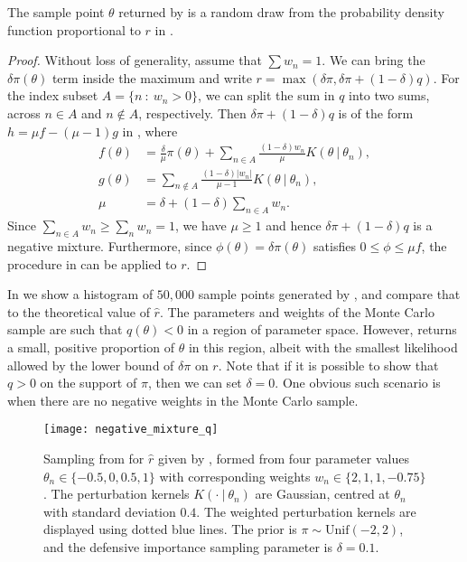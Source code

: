 \documentclass[review]{siamonline190516}
\begin{document}
\begin{proposition}
The sample point $\theta$ returned by  is a random draw from the probability density function proportional to $r$ in .
\end{proposition}
\begin{proof}
Without loss of generality, assume that $\sum w_n = 1$.
We can bring the $\delta \pi(\theta)$ term inside the maximum and write $r = \max(\delta \pi, \delta \pi + (1-\delta) q)$.
For the index subset $A = \{ n~:~w_n>0 \}$, we can split the sum in $q$ into two sums, across $n \in A$ and $n \notin A$, respectively.
Then $\delta \pi + (1-\delta) q$ is of the form $h = \mu f - (\mu - 1) g$ in , where
\begin{align*}
f(\theta) &= \frac{\delta}{\mu} \pi(\theta) + \sum_{n \in A} \frac{(1-\delta) w_n}{\mu} K(\theta~|~\theta_n),
\\
g(\theta) &= \sum_{n \notin A} \frac{(1-\delta)\left|w_n\right|}{\mu - 1} K(\theta~|~\theta_n),
\\
\mu &= \delta + (1-\delta) \sum_{n \in A} w_n.
\end{align*}
Since $\sum_{n \in A} w_n \geq \sum_n w_n = 1$, we have $\mu \geq 1$ and hence $\delta \pi + (1-\delta) q$ is a negative mixture.
Furthermore, since $\phi(\theta) = \delta \pi(\theta)$ satisfies $0 \leq \phi\leq \mu f$, the procedure in  can be applied to $r$.
\end{proof}

In  we show a histogram of $50,000$ sample points generated by , and compare that to the theoretical value of $\hat r$.
The parameters and weights of the Monte Carlo sample are such that $q(\theta) < 0$ in a region of parameter space. 
However,  returns a small, positive proportion of $\theta$ in this region, albeit with the smallest likelihood allowed by the lower bound of $\delta \pi$ on $r$.
Note that if it is possible to show that $q>0$ on the support of $\pi$, then we can set $\delta=0$.
One obvious such scenario is when there are no negative weights in the Monte Carlo sample.

\begin{figure}
\centering
\texttt{[image: negative\_mixture\_q]}
\caption{
Sampling from  for $\hat r$ given by , formed from four parameter values $\theta_n \in \{-0.5, 0, 0.5, 1\}$ with corresponding weights $w_n \in \{2, 1, 1, -0.75\}$. 
The perturbation kernels $K(\cdot~|~\theta_n)$ are Gaussian, centred at $\theta_n$ with standard deviation $0.4$.
The weighted perturbation kernels are displayed using dotted blue lines. 
The prior is $\pi \sim \mathrm{Unif}(-2, 2)$, and the defensive importance sampling parameter is $\delta = 0.1$.
}
\label{fig:negative_mixture_q}
\end{figure}
\end{document}
